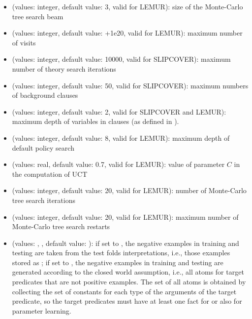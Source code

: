 \documentclass[letterpaper,10pt,english]{sphinxmanual}
\begin{document}
\begin{itemize}
\item {} 
 (values: integer, default value: 3, valid for LEMUR): size of the Monte-Carlo tree search beam

\item {} 
 (values: integer, default value: +1e20, valid for LEMUR): maximum number of visits

\item {} 
 (values: integer, default value: 10000, valid for SLIPCOVER): maximum number of theory search iterations

\item {} 
 (values: integer, default value: 50, valid for SLIPCOVER): maximum numbers of background clauses

\item {} 
 (values: integer, default value: 2, valid for SLIPCOVER and LEMUR): maximum depth of variables in clauses (as defined in ).

\item {} 
 (values: integer, default value: 8, valid for LEMUR): maximum depth of default policy search

\item {} 
 (values: real, default value: 0.7, valid for LEMUR): value of parameter \(C\) in the computation of UCT

\item {} 
 (values: integer, default value: 20, valid for LEMUR): number of Monte-Carlo tree search iterations

\item {} 
 (values: integer, default value: 20, valid for LEMUR): maximum number of Monte-Carlo tree search restarts

\item {} 
 (values: , , default value: ): if set to , the negative examples in training and testing are taken from the test folds interpretations, i.e., those examples  stored as ; if set to , the negative examples in training and testing are generated according to the closed world assumption, i.e., all atoms for target predicates that are not positive examples. The set of all atoms is obtained by collecting the set of constants for each type of the arguments of the target predicate, so the target predicates must have at least one fact for  or  also for parameter learning.


\end{itemize}
\end{document}
